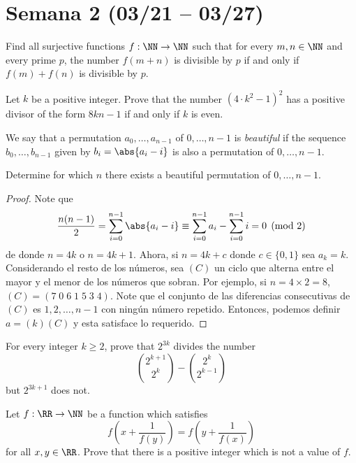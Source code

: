 \section{Semana 2 (03/21 -- 03/27)}

\begin{problem}
	Find all surjective functions $f:\NN\to\NN$ such that for every $m,n\in\NN$ and every prime $p$, the number $f(m+n)$ is divisible by $p$ if and only if $f(m)+f(n)$ is divisible by $p$.
\end{problem}

\begin{problem}
	Let $k$ be a positive integer. Prove that the number $(4\cdot k^2-1)^2$ has a positive divisor of the form $8kn-1$ if and only if $k$ is even.
\end{problem}

\begin{probER}
	We say that a permutation $a_0,\dots,a_{n-1}$ of $0,\dots,n-1$ is \emph{beautiful} if the sequence $b_0,\dots,b_{n-1}$ given by $b_i=\abs{a_i-i}$ is also a permutation of $0,\dots,n-1$.

	Determine for which $n$ there exists a beautiful permutation of $0,\dots,n-1$.
\end{probER}

\begin{proof}
	Note que
	\[\frac{n(n-1)}{2}=\sum_{i=0}^{n-1}\abs{a_i-i}\equiv\sum_{i=0}^{n-1}a_i-\sum_{i=0}^{n-1}i=0\pmod 2\]
	de donde $n=4k$ o $n=4k+1$. Ahora, si $n=4k+c$ donde $c\in\{0,1\}$ sea $a_k=k$. Considerando el resto de los números, sea $(C)$ un ciclo que alterna entre el mayor y el menor de los números que sobran. Por ejemplo, si $n=4\times 2=8$, $(C)=(7\;0\;6\;1\;5\;3\;4)$. Note que el conjunto de las diferencias consecutivas de $(C)$ es $1,2,\dots,n-1$ con ningún número repetido. Entonces, podemos definir $a=(k)(C)$ y esta satisface lo requerido.
\end{proof}

\begin{problem}
	For every integer $k\ge 2$, prove that $2^{3k}$ divides the number
	\[\binom{2^{k+1}}{2^k}-\binom{2^k}{2^{k-1}}\]
	but $2^{3k+1}$ does not.
\end{problem}

\begin{problem}
	Let $f:\RR\to\NN$ be a function which satisfies
	\[f\left(x+\frac{1}{f(y)}\right)=f\left(y+\frac{1}{f(x)}\right)\]
	for all $x,y\in\RR$. Prove that there is a positive integer which is not a value of $f$.
\end{problem}

